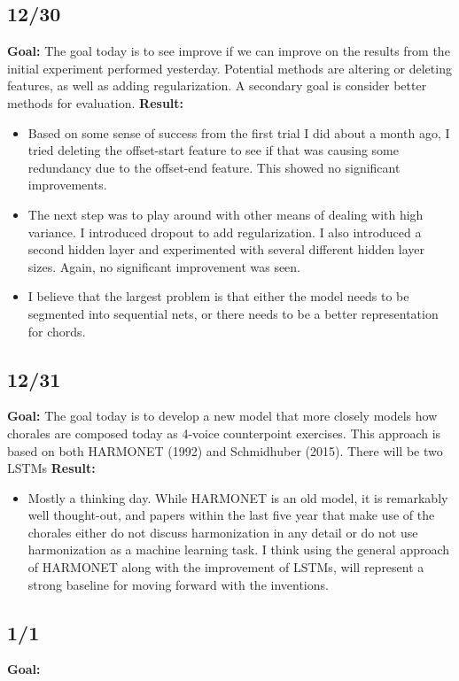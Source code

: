 \documentclass[12pt]{article}
\begin{document}
\subsection{12/30}
\textbf{Goal:} The goal today is to see improve if we can improve on the results from the initial experiment performed yesterday. Potential methods are altering or deleting features, as well as adding regularization. A secondary goal is consider better methods for evaluation.
\textbf{Result: }
\begin{itemize}
\item Based on some sense of success from the first trial I did about a month ago, I tried deleting the offset-start feature to see if that was causing some redundancy due to the offset-end feature. This showed no significant improvements.
\item The next step was to play around with other means of dealing with high variance. I introduced dropout to add regularization. I also introduced a second hidden layer and experimented with several different hidden layer sizes. Again, no significant improvement was seen.
\item I believe that the largest problem is that either the model needs to be segmented into sequential nets, or there needs to be a better representation for chords.
\end{itemize}

\subsection{12/31}
\textbf{Goal:} The goal today is to develop a new model that more closely models how chorales are composed today as 4-voice counterpoint exercises. This approach is based on both HARMONET (1992) and Schmidhuber (2015). There will be two LSTMs
\textbf{Result:} 
\begin{itemize}
\item Mostly a thinking day. While HARMONET is an old model, it is remarkably well thought-out, and papers within the last five year that make use of the chorales either do not discuss harmonization in any detail or do not use harmonization as a machine learning task. I think using the general approach of HARMONET along with the improvement of LSTMs, will represent a strong baseline for moving forward with the inventions.
\end{itemize}

\subsection{1/1}
\textbf{Goal:} 
\end{document}
